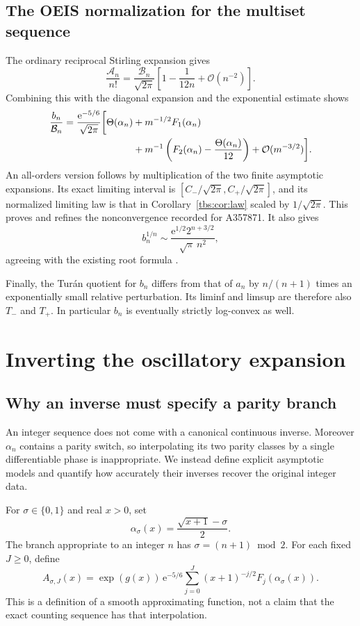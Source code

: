 \documentclass[11pt,a4paper]{article}
\numberwithin{equation}{section}
\theoremstyle{definition}
\newcommand{\Acal}{\mathcal A}
\newcommand{\Bcal}{\mathcal B}
\newcommand{\ee}{\mathrm e}
\newcommand{\OO}{\mathcal O}
\begin{document}
\subsection{The OEIS normalization for the multiset sequence}
The ordinary reciprocal Stirling expansion gives
\begin{equation}\label{tbs:eq:scales-related}
 \frac{\Acal_n}{n!}
 =\frac{\Bcal_n}{\sqrt{2\pi}}
   \left[1-\frac1{12n}+\OO(n^{-2})\right].
\end{equation}
Combining this with the diagonal expansion and the exponential estimate
shows
\begin{align}\label{tbs:eq:b-normalized}
 \frac{b_n}{\Bcal_n}
 =\frac{\ee^{-5/6}}{\sqrt{2\pi}}
 \bigg[\Theta(\alpha_n)&+m^{-1/2}F_1(\alpha_n)\notag\\
 &+m^{-1}\left(F_2(\alpha_n)-\frac{\Theta(\alpha_n)}{12}\right)
 +\OO(m^{-3/2})\bigg].
\end{align}
An all-orders version follows by multiplication of the two finite
asymptotic expansions. Its exact limiting interval is
$[C_-/\sqrt{2\pi},C_+/\sqrt{2\pi}]$, and its normalized limiting law is
that in Corollary~\ref{tbs:cor:law} scaled by $1/\sqrt{2\pi}$.
This proves and refines the nonconvergence recorded for A357871.
It also gives
\[
 b_n^{1/n}\sim
 \frac{\ee^{1/2}2^{n+3/2}}{\sqrt\pi\,n^2},
\]
agreeing with the existing root formula \cite{oeisb}.

Finally, the Tur\'an quotient for $b_n$ differs from that of $a_n$ by
$n/(n+1)$ times an exponentially small relative perturbation. Its
liminf and limsup are therefore also $T_-$ and $T_+$. In particular
$b_n$ is eventually strictly log-convex as well.

\section{Inverting the oscillatory expansion}\label{tbs:sec:inverse}

\subsection{Why an inverse must specify a parity branch}
An integer sequence does not come with a canonical continuous inverse.
Moreover $\alpha_n$ contains a parity switch, so interpolating its two
parity classes by a single differentiable phase is inappropriate.
We instead define explicit asymptotic models and quantify how accurately
their inverses recover the original integer data.

For $\sigma\in\{0,1\}$ and real $x>0$, set
\begin{equation}\label{tbs:eq:branch-phase}
 \alpha_\sigma(x)=\frac{\sqrt{x+1}-\sigma}{2}.
\end{equation}
The branch appropriate to an integer $n$ has
$\sigma=(n+1)\bmod2$. For each fixed $J\ge0$, define
\begin{equation}\label{tbs:eq:inverse-model}
 A_{\sigma,J}(x)=\exp(g(x))\,\ee^{-5/6}
 \sum_{j=0}^J(x+1)^{-j/2}F_j(\alpha_\sigma(x)).
\end{equation}
This is a definition of a smooth approximating function, not a claim
that the exact counting sequence has that interpolation.
\end{document}
